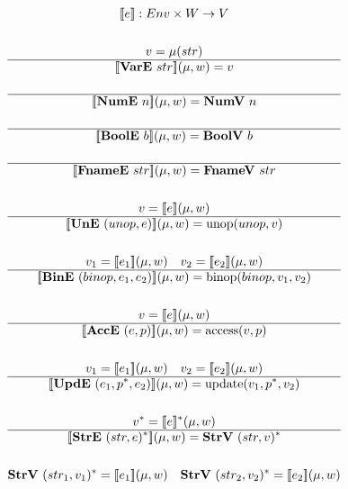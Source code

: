 \begin{gather*}
  \sem{e} : Env \times W \rightarrow V \\
%
\newline \\
  v = \mu(str) \\
  \hline
  \sem{\vare ~ str}(\mu, w) = v \\
%
\newline \\
  \hline
  \sem{\nume ~ n}(\mu, w) = \numv ~ n \\
%
\newline \\
  \hline
  \sem{\boole ~ b}(\mu, w) = \boolv ~ b \\
%
\newline \\
  \hline
  \sem{\fnamee ~ str}(\mu, w) = \fnamev ~ str \\
%
\newline \\
  v = \sem{e}(\mu, w) \\
  \hline
  \sem{\une ~ (unop, e)}(\mu, w) = \unop(unop, v) \\
%
\newline \\
  v_1 = \sem{e_1}(\mu, w) \quad v_2 = \sem{e_2}(\mu, w) \\
  \hline
  \sem{\bine ~ (binop, e_1, e_2)}(\mu, w) = \binop(binop, v_1, v_2) \\
%
\newline \\
  v = \sem{e}(\mu, w) \\
  \hline
  \sem{\acce ~ (e, p)}(\mu, w) = \access(v, p) \\
%
\newline \\
  v_1 = \sem{e_1}(\mu, w) \quad v_2 = \sem{e_2}(\mu, w) \\
  \hline
  \sem{\upde ~ (e_1, \seq p, e_2)}(\mu, w) = \update(v_1, \seq p, v_2) \\
%
\newline \\
  \seq v = \seq{\sem{e}}(\mu, w) \\
  \hline
  \sem{\stre ~ \seq{(str, e)}}(\mu, w) = \strv ~ \seq{(str, v)} \\
%
\newline \\
  \strv ~ \seq{(str_1, v_1)} = \sem{e_1}(\mu, w) \quad
  \strv ~ \seq{(str_2, v_2)} = \sem{e_2}(\mu, w) \\

\end{gather*}
